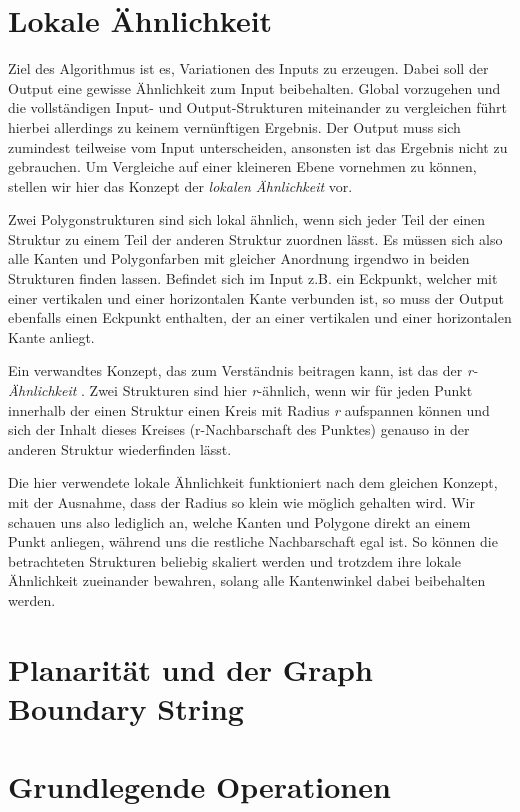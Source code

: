 \section{Lokale Ähnlichkeit}
Ziel des Algorithmus ist es, Variationen des Inputs zu erzeugen. Dabei soll der Output eine gewisse Ähnlichkeit zum Input beibehalten. Global
vorzugehen und die vollständigen Input- und Output-Strukturen miteinander zu vergleichen führt hierbei allerdings zu keinem vernünftigen
Ergebnis. Der Output muss sich zumindest teilweise vom Input unterscheiden, ansonsten ist das Ergebnis nicht zu gebrauchen. Um Vergleiche
auf einer kleineren Ebene vornehmen zu können, stellen wir hier das Konzept der \textit{lokalen Ähnlichkeit} vor.

Zwei Polygonstrukturen sind sich lokal ähnlich, wenn sich jeder Teil der einen Struktur zu einem Teil der anderen Struktur zuordnen lässt. Es
müssen sich also alle Kanten und Polygonfarben mit gleicher Anordnung irgendwo in beiden Strukturen finden lassen. Befindet sich im Input z.B.
ein Eckpunkt, welcher mit einer vertikalen und einer horizontalen Kante verbunden ist, so muss der Output ebenfalls einen Eckpunkt enthalten,
der an einer vertikalen und einer horizontalen Kante anliegt.


Ein verwandtes Konzept, das zum Verständnis beitragen kann, ist das der \textit{r-Ähnlichkeit} \cite{3_bokeloh_et_al}. Zwei Strukturen sind hier
\textit{r}-ähnlich, wenn wir für jeden Punkt innerhalb der einen Struktur einen Kreis mit Radius \textit{r} aufspannen können und sich der Inhalt
dieses Kreises (r-Nachbarschaft des Punktes) genauso in der anderen Struktur wiederfinden lässt.


Die hier verwendete lokale Ähnlichkeit funktioniert nach dem gleichen Konzept, mit der Ausnahme, dass der Radius so klein wie möglich gehalten
wird. Wir schauen uns also lediglich an, welche Kanten und Polygone direkt an einem Punkt anliegen, während uns die restliche Nachbarschaft
egal ist. So können die betrachteten Strukturen beliebig skaliert werden und trotzdem ihre lokale Ähnlichkeit zueinander bewahren, solang alle
Kantenwinkel dabei beibehalten werden.

\section{Planarität und der Graph Boundary String}



\section{Grundlegende Operationen}
